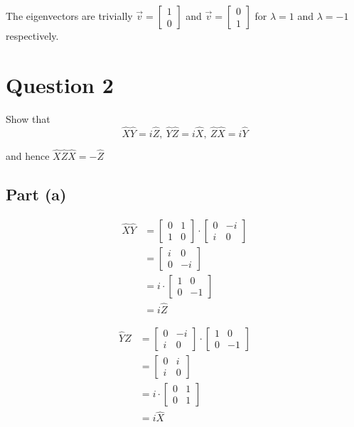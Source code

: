 \documentclass[12pt,a4paper]{article}
\begin{document}
			The eigenvectors are trivially $\vec{v} = \begin{bmatrix} 1 \\ 0\end{bmatrix}$ and $\vec{v} = \begin{bmatrix} 0 \\ 1\end{bmatrix}$ for $\lambda = 1$ and $\lambda = -1$ respectively.

    \section{Question 2}
		\begin{mdframed}
			Show that 
			\begin{equation*}
				\hat{X}\hat{Y} = i\hat{Z}, \ \hat{Y}\hat{Z} = i\hat{X}, \ \hat{Z}\hat{X} = i\hat{Y}
			\end{equation*}

			and hence $\hat{X}\hat{Z}\hat{X} = -\hat{Z}$
		\end{mdframed}
			
		\subsection{Part (a)}
			\begin{align*}
				\hat{X}\hat{Y} &= \begin{bmatrix} 0 & 1 \\ 1 & 0\end{bmatrix}\cdot \begin{bmatrix}0 & -i \\ i & 0\end{bmatrix} \\
				&= \begin{bmatrix} i & 0 \\ 0 & -i\end{bmatrix} \\
				&= i\cdot \begin{bmatrix} 1 & 0 \\ 0 & -1\end{bmatrix} \\
				&= i\hat{Z}
			\end{align*}

			\begin{align*}
				\hat{Y}\hat{Z} &= \begin{bmatrix} 0 & -i \\ i & 0\end{bmatrix}\cdot \begin{bmatrix}1 & 0 \\ 0 & -1\end{bmatrix} \\
				&= \begin{bmatrix} 0 & i \\ i & 0\end{bmatrix} \\
				&= i\cdot \begin{bmatrix} 0 & 1 \\ 0 & 1\end{bmatrix} \\
				&= i\hat{X}
			\end{align*}
\end{document}

